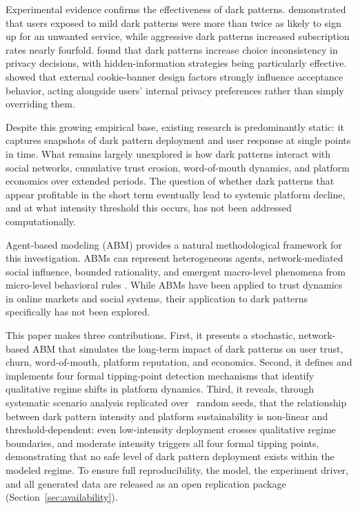 \documentclass[a4paper,fleqn]{cas-sc}
\begin{document}
Experimental evidence confirms the effectiveness of dark patterns. \citet{luguri2021} demonstrated that users exposed to mild dark patterns were more than twice as likely to sign up for an unwanted service, while aggressive dark patterns increased subscription rates nearly fourfold. \citet{bogliacino2026} found that dark patterns increase choice inconsistency in privacy decisions, with hidden-information strategies being particularly effective. \citet{papenmeier2025} showed that external cookie-banner design factors strongly influence acceptance behavior, acting alongside users' internal privacy preferences rather than simply overriding them.

Despite this growing empirical base, existing research is predominantly static: it captures snapshots of dark pattern deployment and user response at single points in time. What remains largely unexplored is how dark patterns interact with social networks, cumulative trust erosion, word-of-mouth dynamics, and platform economics over extended periods. The question of whether dark patterns that appear profitable in the short term eventually lead to systemic platform decline, and at what intensity threshold this occurs, has not been addressed computationally.

Agent-based modeling (ABM) provides a natural methodological framework for this investigation. ABMs can represent heterogeneous agents, network-mediated social influence, bounded rationality, and emergent macro-level phenomena from micro-level behavioral rules \citep{mesa2024}. While ABMs have been applied to trust dynamics in online markets and social systems, their application to dark patterns specifically has not been explored.

This paper makes three contributions. First, it presents a stochastic, network-based ABM that simulates the long-term impact of dark patterns on user trust, churn, word-of-mouth, platform reputation, and economics. Second, it defines and implements four formal tipping-point detection mechanisms that identify qualitative regime shifts in platform dynamics. Third, it reveals, through systematic scenario analysis replicated over \numReplicates\ random seeds, that the relationship between dark pattern intensity and platform sustainability is non-linear and threshold-dependent: even low-intensity deployment crosses qualitative regime boundaries, and moderate intensity triggers all four formal tipping points, demonstrating that no safe level of dark pattern deployment exists within the modeled regime. To ensure full reproducibility, the model, the experiment driver, and all generated data are released as an open replication package (Section~\ref{sec:availability}).
\end{document}
